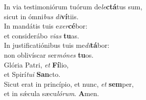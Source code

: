 \evenverse In via testimoniórum tuórum de\textit{le}\textbf{ctá}tus sum,~\*\\
\evenverse sicut in ómni\textit{bus} \textit{di}\textbf{ví}tiis.\\
\oddverse In mandátis tuis e\textit{xer}\textbf{cé}bor:~\*\\
\oddverse et considerábo \textit{vi}\textit{as} \textbf{tu}as.\\
\evenverse In justificatiónibus tuis me\textit{di}\textbf{tá}bor:~\*\\
\evenverse non oblivíscar ser\textit{mó}\textit{nes} \textbf{tu}os.\\
\oddverse Glória Patri, \textit{et} \textbf{Fí}lio,~\*\\
\oddverse et Spirí\textit{tu}\textit{i} \textbf{San}cto.\\
\evenverse Sicut erat in princípio, et nunc, \textit{et} \textbf{sem}per,~\*\\
\evenverse et in sǽcula sæcu\textit{ló}\textit{rum}. \textbf{A}men.\\
